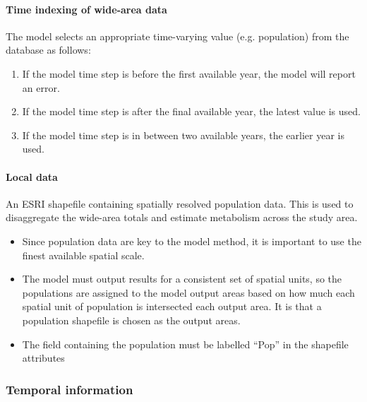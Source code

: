 \documentclass[letterpaper,10pt,english]{sphinxmanual}
\begin{document}
\paragraph{Time indexing of wide-area data}
\label{\detokenize{OtherManuals/LQF_Manual:time-indexing-of-wide-area-data}}
The model selects an appropriate time-varying value (e.g. population)
from the database as follows:
\begin{enumerate}
\item {} 
If the model time step is before the first available year, the model
will report an error.

\item {} 
If the model time step is after the final available year, the latest
value is used.

\item {} 
If the model time step is in between two available years, the earlier
year is used.

\end{enumerate}


\paragraph{Local data}
\label{\detokenize{OtherManuals/LQF_Manual:local-data}}
An ESRI shapefile containing spatially resolved population data. This is
used to disaggregate the wide-area totals and estimate metabolism across
the study area.
\begin{itemize}
\item {} 
Since population data are key to the model method, it is important to
use the finest available spatial scale.

\item {} 
The model must output results for a consistent set of spatial units,
so the populations are assigned to the model output areas based on
how much each spatial unit of population is intersected each output
area. It is  that a population shapefile is chosen as
the output areas.

\item {} 
The field containing the population must be labelled “Pop” in the
shapefile attributes

\end{itemize}


\subsubsection{Temporal information}
\label{\detokenize{OtherManuals/LQF_Manual:temporal-information}}
\end{document}
